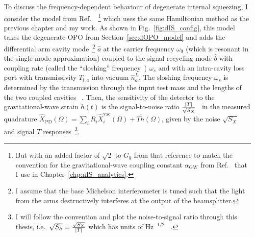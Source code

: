 
To discuss the frequency-dependent behaviour of degenerate internal squeezing, I consider the model from Ref.~\cite{korobkoQuantumExpanderGravitationalwave2019}~\footnote{But with an added factor of $\sqrt{2}$ to $G_0$ from that reference to match the convention for the gravitational-wave coupling constant $\alpha_\text{GW}$ from Ref.~\cite{liBroadbandSensitivityImprovement2020} that I use in Chapter~\ref{chp:nIS_analytics}.} which uses the same Hamiltonian method as the previous chapter and my work.
As shown in Fig.~\ref{fig:dIS_config}, this model takes the degenerate OPO from Section~\ref{sec:dOPO_model} and adds the differential arm cavity mode~\footnote{I assume that the base Michelson interferometer is tuned such that the light from the arms destructively interferes at the output of the beamsplitter.} $\hat a$ at the carrier frequency $\omega_0$ (which is resonant in the single-mode approximation) coupled to the signal-recycling mode $\hat b$ with coupling rate (called the ``sloshing'' frequency~\cite{}) $\omega_s$ and with an intra-cavity loss port with transmissivity $T_{l,a}$ into vacuum $\hat n^L_a$. The sloshing frequency $\omega_s$ is determined by the transmission through the input test mass and the lengths of the two coupled cavities~\cite{} .
Then, the sensitivity of the detector to the gravitational-wave strain $h(t)$ is the signal-to-noise ratio $\frac{\abs{T}}{\sqrt{S_X}}$~\cite{} in the measured quadrature $\hat X_\text{PD}(\Omega)=\sum_i R_i \hat X_i^\text{vac}(\Omega) + T \tilde h(\Omega)$, given by the noise $\sqrt{S_X}$ and signal $T$ responses~\footnote{I will follow the convention and plot the noise-to-signal ratio through this thesis, i.e.\ $\sqrt{S_h}=\frac{\sqrt{S_X}}{\abs{T}}$ which has units of $\text{Hz}^{-1/2}$~\cite{} .}. 

